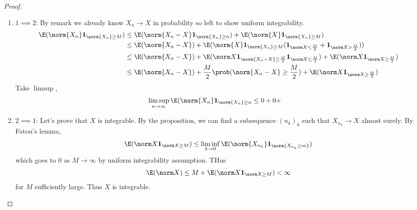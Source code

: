 \documentclass[a4paper]{article}
\renewcommand{\P}{\prob} %
\begin{document}
\begin{proof}\leavevmode
  \begin{enumerate}
  \item \(1 \implies 2\): By remark we already know \(X_n \to X\) in probability so left to show uniform integrability.
    \begin{align*}
      \E(\norm{X_n} \mathbf 1_{\norm{X_n} \geq M})
      &\leq \E(\norm{X_n - X} \mathbf 1_{\norm{X_n} \geq n}) + \E(\norm{X} \mathbf 1_{\norm{X_n} \geq M}) \\
      &\leq \E(\norm{X_n - X}) + \E(\norm{X} \mathbf 1_{\norm{X_n} \geq M} (\mathbf 1_{\norm X \leq \frac{M}{2}} + \mathbf 1_{\norm X > \frac{M}{2}})) \\
      &\leq \E(\norm{X_n - X}) + \E(\norm X \mathbf 1_{\norm{X_n - X} \geq \frac{M}{2}} \mathbf 1_{\norm X \leq \frac{M}{2}}) + \E(\norm X \mathbf 1_{\norm X \geq \frac{M}{2}}) \\
      &\leq \E(\norm{X_n - X}) + \frac{M}{2} \P(\norm{X_n - X} \geq \frac{M}{2}) + \E(\norm X \mathbf 1_{\norm X \geq \frac{M}{2}})
    \end{align*}
    Take \(\limsup\),
    \begin{align*}
      \limsup_{n \to \infty} \E(\norm{X_n} \mathbf 1_{\norm{X_n} \geq n}
      &\leq 0 + 0 +
    \end{align*}
  \item \(2 \implies 1\): Let's prove that \(X\) is integrable. By the proposition, we can find a subsequence \((n_k)_k\) such that \(X_{n_k} \to X\) almost surely. By Fatou's lemma,
    \[
      \E(\norm X \mathbf 1_{\norm X \geq M}) \leq \liminf_{k \to 0} \E(\norm{X_{n_k}} \mathbf 1_{\norm{X_{n_k} \geq m}})
    \]
    which goes to \(0\) as \(M \to \infty\) by uniform integrability assumption. THus
    \[
      \E(\norm X) \leq M + \E(\norm X \mathbf 1_{\norm X \geq M}) < \infty
    \]
    for \(M\) sufficiently large. Thus \(X\) is integrable.


\end{enumerate}
\end{proof}
\end{document}
